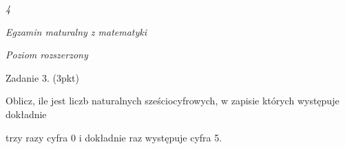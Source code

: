 \documentclass[a4paper,12pt]{article}
\begin{document}
{\it 4}

{\it Egzamin maturalny z matematyki}

{\it Poziom rozszerzony}

Zadanie 3. (3pkt)

Oblicz, ile jest liczb naturalnych sześciocyfrowych, w zapisie których występuje dokładnie

trzy razy cyfra 0 i dokładnie raz występuje cyfra 5.
\end{document}
